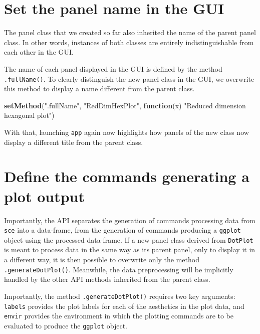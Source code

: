 \documentclass[
]{book}
\newenvironment{Shaded}{\begin{snugshade}}{\end{snugshade}}
\newcommand{\ControlFlowTok}[1]{\textcolor[rgb]{0.13,0.29,0.53}{\textbf{#1}}}
\newcommand{\KeywordTok}[1]{\textcolor[rgb]{0.13,0.29,0.53}{\textbf{#1}}}
\newcommand{\NormalTok}[1]{#1}
\newcommand{\StringTok}[1]{\textcolor[rgb]{0.31,0.60,0.02}{#1}}
\begin{document}
\hypertarget{set-the-panel-name-in-the-gui}{%
\section{Set the panel name in the GUI}\label{set-the-panel-name-in-the-gui}}

The panel class that we created so far also inherited the name of the parent panel class.
In other words, instances of both classes are entirely indistinguishable from each other in the GUI.

The name of each panel displayed in the GUI is defined by the method \texttt{.fullName()}.
To clearly distinguish the new panel class in the GUI, we overwrite this method to display a name different from the parent class.

\begin{Shaded}
\begin{Highlighting}[]
\KeywordTok{setMethod}\NormalTok{(}\StringTok{".fullName"}\NormalTok{, }\StringTok{"RedDimHexPlot"}\NormalTok{, }\ControlFlowTok{function}\NormalTok{(x) }\StringTok{"Reduced dimension hexagonal plot"}\NormalTok{)}
\end{Highlighting}
\end{Shaded}

With that, launching \texttt{app} again now highlights how panels of the new class now display a different title from the parent class.

\hypertarget{define-the-commands-generating-a-plot-output}{%
\section{Define the commands generating a plot output}\label{define-the-commands-generating-a-plot-output}}

Importantly, the API separates the generation of commands processing data from \texttt{sce} into a data-frame, from the generation of commands producing a \texttt{ggplot} object using the processed data-frame.
If a new panel class derived from \texttt{DotPlot} is meant to process data in the same way as its parent panel, only to display it in a different way, it is then possible to overwrite only the method \texttt{.generateDotPlot()}.
Meanwhile, the data preprocessing will be implicitly handled by the other API methods inherited from the parent class.

Importantly, the method \texttt{.generateDotPlot()} requires two key arguments: \texttt{labels} provides the plot labels for each of the aesthetics in the plot data, and \texttt{envir} provides the environment in which the plotting commands are to be evaluated to produce the \texttt{ggplot} object.
\end{document}
